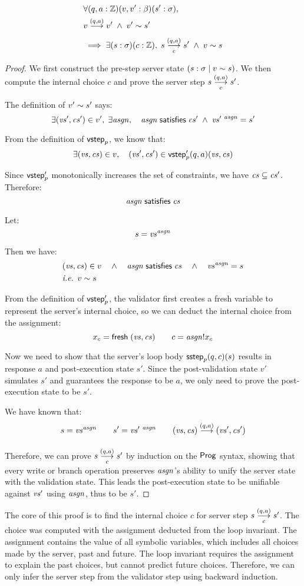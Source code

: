 \begin{lemma}[\ref{eq:rc2}]
\begin{align*}
&\forall(q,a:\Int)(v,v':\beta)(s':\sigma),\\
&\behaves v{(q,a)}v'\;\wedge\;\Reflects{v'}{s'}\\
&\implies\exists(s:\sigma)(c:\Int),\;\triggers sc{(q,a)}s'\;\wedge\;\Reflects{v}{s}
\end{align*}
\begin{proof}
We first construct the pre-step server state $(s:\sigma\mid v\sim s)$.
We then compute the internal choice $c$ and prove the server step $\triggers
sc{(q,a)}s'$.

The definition of $v'\sim s'$ says:
\[\exists (\mathit{vs}',\mathit{cs}')\in v',\;\exists \mathit{asgn},\quad \mathit{asgn}\;\mathsf{satisfies}\;\mathit{cs}'\;\wedge\;\mathit{vs}'^{~\mathit{asgn}}=s'\]

From the definition of $\mathsf{vstep}_p$, we know that:
\[\exists (\mathit{vs},\mathit{cs})\in v,\quad (\mathit{vs}',\mathit{cs}')\in\mathsf{vstep}'_p(q,a)(\mathit{vs},\mathit{cs})\]

Since $\mathsf{vstep}'_p$ monotonically increases the set of constraints, we have
$\mathit{cs}\subseteq \mathit{cs}'$.  Therefore: \[\mathit{asgn}\;\mathsf{satisfies}\;\mathit{cs}\]

Let: \[s=\mathit{vs}^{\mathit{asgn}}\]

Then we have:
\begin{align*}
&(\mathit{vs},\mathit{cs})\in v\quad\wedge\quad\mathit{asgn}\;\mathsf{satisfies}\;\mathit{cs}\quad\wedge\quad \mathit{vs}^{\mathit{asgn}}=s\\
&\textit{i.e. }v\sim s
\end{align*}

From the definition of $\mathsf{vstep}'_p$, the validator first creates a fresh variable
to represent the server's internal choice, so we can deduct the internal choice
from the assignment:
\[x_c=\mathsf{fresh}\;(\mathit{vs},\mathit{cs})\qquad c=\mathit{asgn}!x_c\]

Now we need to show that the server's loop body $\mathsf{sstep}_p(q,c)(s)$ results in
response $a$ and post-execution state $s'$.  Since the post-validation state
$v'$ simulates $s'$ and guarantees the response to be $a$, we only need to prove
the post-execution state to be $s'$.

We have known that:
\[s=\vs^\asgn\qquad s'=\vs'^{~\asgn}\qquad\behaves{(\vs,\cs)}{(q,a)}{(\vs',\cs')}\]

Therefore, we can prove $\triggers sc{(q,a)}s'$ by induction on the $\mathsf{Prog}$
syntax, showing that every write or branch operation preserves $\mathit{asgn}$'s ability
to unify the server state with the validation state.  This leads the
post-execution state to be unifiable against $\mathit{vs}'$ using $\mathit{asgn}$, thus to be
$s'$.
\end{proof}

The core of this proof is to find the internal choice $c$ for server step
$\triggers sc{(q,a)}s'$.  The choice was computed with the assignment deducted
from the loop invariant.  The assignment contains the value of all symbolic
variables, which includes all choices made by the server, past and future.  The
loop invariant requires the assignment to explain the past choices, but cannot
predict future choices.  Therefore, we can only infer the server step from the
validator step using backward induction.
\end{lemma}

